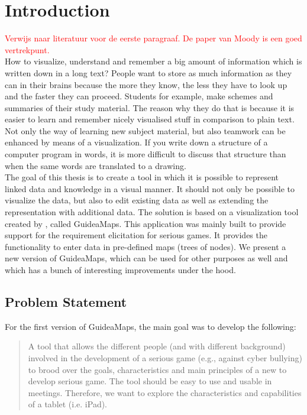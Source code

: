 \chapter{Introduction}\label{ch:introduction}

\textcolor{red}{Verwijs naar literatuur voor de eerste paragraaf. De paper van Moody is een goed vertrekpunt.} \\
How to visualize, understand and remember a big amount of information which is written down in a long text? People want to store as much information as they can in their brains because the more they know, the less they have to look up and the faster they can proceed. Students for example, make schemes and summaries of their study material. The reason why they do that is because it is easier to learn and remember nicely visualised stuff in comparison to plain text.
Not only the way of learning new subject material, but also teamwork can be enhanced by means of a visualization. If you write down a structure of a computer program in words, it is more difficult to discuss that structure than when the same words are translated to a drawing.\\

The goal of this thesis is to create a tool in which it is possible to represent linked data and knowledge in a visual manner. It should not only be possible to visualize the data, but also to edit existing data as well as extending the representation with additional data. The solution is based on a visualization tool created by \cite{erikjanssens}, called GuideaMaps. This application was mainly built to provide support for the requirement elicitation for serious games. It provides the functionality to enter data in pre-defined maps (trees of nodes). We present a new version of GuideaMaps, which can be used for other purposes as well and which has a bunch of interesting improvements under the hood.

\section{Problem Statement}\label{sec:problem-statement}
For the first version of GuideaMaps, the main goal was to develop the following:

\begin{quote}
A tool that allows the different people (and with different background) involved in the development of a serious game (e.g., against cyber bullying) to brood over the goals, characteristics and main principles of a new to develop serious game. The tool should be easy to use and usable in meetings. Therefore, we want to explore the characteristics and capabilities of a tablet (i.e. iPad). \hfill \citep{erikjanssens}
\end{quote}

